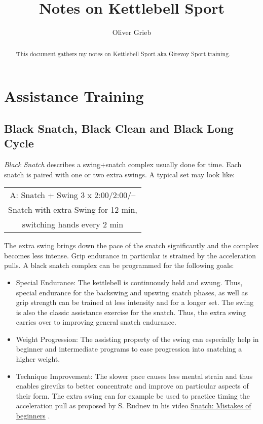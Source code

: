 \documentclass[a4paper,11pt,oneside]{article}
\author{Oliver Grieb}
\title{Notes on Kettlebell Sport}
\begin{document}
\maketitle

\begin{abstract}
This document gathers my notes on Kettlebell Sport aka Girevoy Sport training.
\end{abstract}


\section{Assistance Training}

\subsection{Black Snatch, Black Clean and Black Long Cycle}

\emph{Black Snatch} describes a swing+snatch complex usually done for time. Each
 snatch is paired with one or two extra swings. A typical set may look like:

\begin{center}
\begin{tabular}{c}
\hline
A: Snatch + Swing 3 x 2:00/2:00/-- \\
Snatch with extra Swing for 12 min, \\
switching hands every 2 min \\
\hline
\end{tabular}
\end{center}

The extra swing brings down the pace of the snatch significantly and the complex 
becomes less intense. Grip endurance in particular is strained by the acceleration 
pulls. A black snatch complex can be programmed for the following goals:

\begin{itemize}

  \item{Special Endurance:} The kettlebell is continuously held and swung. Thus, 
  special endurance for the backswing and upswing snatch phases, as well as grip 
  strength can be trained at less intensity and for a longer set. The swing is also 
  the classic assistance exercise for the snatch. Thus, the extra swing carries over 
  to improving general snatch endurance.
  
  \item{Weight Progression:} The assisting property of the swing can especially help 
  in beginner and intermediate programs to ease progression into snatching a higher 
  weight.
  
  \item{Technique Improvement:} The slower pace causes less mental strain and thus 
  enables gireviks to better concentrate and improve on particular aspects of their 
  form. The extra swing can for example be used to practice timing the acceleration 
  pull as proposed by S. Rudnev in his video 
  \href{https://youtu.be/N186yUP9LcU?t=89}{Snatch: Mistakes of beginners} 
  \cite{rkbyten_snatch_beginner_mistakes}.  

\end{itemize}
\end{document}
